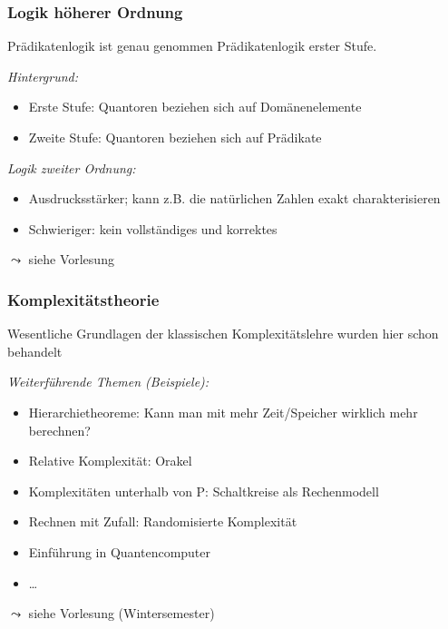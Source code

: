 \documentclass[aspectratio=1610,onlymath]{beamer}
\begin{document}
\begin{frame}\frametitle{Logik höherer Ordnung}

Prädikatenlogik ist genau genommen \alert{Prädikatenlogik erster Stufe}.
\bigskip

\emph{Hintergrund:}
\begin{itemize}
\item Erste Stufe: Quantoren beziehen sich auf Domänenelemente\smallskip

\item Zweite Stufe: Quantoren beziehen sich auf Prädikate\smallskip

\end{itemize}\bigskip

\emph{Logik zweiter Ordnung:}
\begin{itemize}
\item Ausdrucksstärker; kann z.B. die natürlichen Zahlen exakt charakterisieren
\item Schwieriger: kein vollständiges und korrektes 
\end{itemize}

$\leadsto$ siehe Vorlesung 

\end{frame}

\begin{frame}\frametitle{Komplexitätstheorie}

Wesentliche Grundlagen der klassischen Komplexitätslehre wurden hier schon behandelt
\bigskip

\emph{Weiterführende Themen (Beispiele):}
\begin{itemize}
\item Hierarchietheoreme: Kann man mit mehr Zeit/Speicher wirklich mehr berechnen?
\item Relative Komplexität: Orakel
\item Komplexitäten unterhalb von P: Schaltkreise als Rechenmodell
\item Rechnen mit Zufall: Randomisierte Komplexität
\item Einführung in Quantencomputer
\item \ldots
\end{itemize}

$\leadsto$ siehe Vorlesung  (Wintersemester)

\end{frame}
\end{document}

